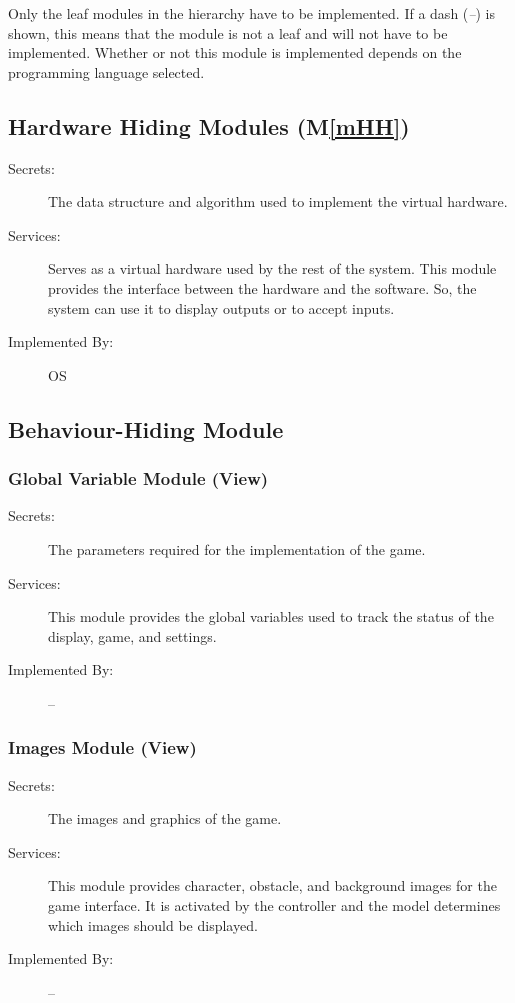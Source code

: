 \documentclass[12pt, titlepage]{article}
\newcommand{\mref}[1]{M\ref{#1}}
\begin{document}
Only the leaf modules in the
hierarchy have to be implemented. If a dash (\emph{--}) is shown, this means
that the module is not a leaf and will not have to be implemented. Whether or
not this module is implemented depends on the programming language
selected.

\subsection{Hardware Hiding Modules (\mref{mHH})}

\begin{description}
\item[Secrets:]The data structure and algorithm used to implement the virtual
  hardware.
\item[Services:]Serves as a virtual hardware used by the rest of the
  system. This module provides the interface between the hardware and the
  software. So, the system can use it to display outputs or to accept inputs.
\item[Implemented By:] OS
\end{description}

\subsection{Behaviour-Hiding Module}

\subsubsection{Global Variable Module (View)}

\begin{description}
\item[Secrets:] The parameters required for the implementation of the game.
\item[Services:] This module provides the global variables used to track the status of the display, game, and settings. 
\item[Implemented By:] --
\end{description}

\subsubsection{Images Module (View)}
\begin{description}
\item[Secrets:]The images and graphics of the game.
\item[Services:] This module provides character, obstacle, and background images for the game interface. It is activated by the controller and the model determines which images should be displayed.
\item[Implemented By:] --
\end{description}
\end{document}
